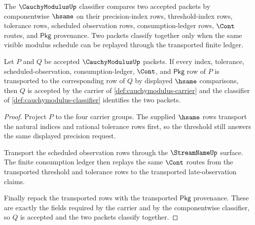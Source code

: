 \begin{definition}
\label{def:cauchymodulus-classifier}
The $\CauchyModulusUp$ classifier compares two accepted packets by componentwise
$\hsame$ on their precision-index rows, threshold-index rows, tolerance rows,
scheduled observation rows, consumption-ledger rows, $\Cont$ routes, and
$\mathsf{Pkg}$ provenance. Two packets classify together only when the same
visible modulus schedule can be replayed through the transported finite ledger.
\end{definition}

\begin{theorem}
\label{thm:cauchymodulus-hsame-stability}
Let $P$ and $Q$ be accepted $\CauchyModulusUp$ packets. If every index,
tolerance, scheduled-observation, consumption-ledger, $\Cont$, and
$\mathsf{Pkg}$ row of $P$ is transported to the corresponding row of $Q$ by
displayed $\hsame$ comparisons, then $Q$ is accepted by the carrier of
\autoref{def:cauchymodulus-carrier} and the classifier of
\autoref{def:cauchymodulus-classifier} identifies the two packets.
\end{theorem}
\begin{proof}
Project $P$ to the four carrier groups. The supplied $\hsame$ rows transport
the natural indices and rational tolerance rows first, so the threshold still
answers the same displayed precision request.

Transport the scheduled observation rows through the $\StreamNameUp$ surface.
The finite consumption ledger then replays the same $\Cont$ routes from the
transported threshold and tolerance rows to the transported late-observation
claims.

Finally repack the transported rows with the transported $\mathsf{Pkg}$
provenance. These are exactly the fields required by the carrier and by the
componentwise classifier, so $Q$ is accepted and the two packets classify
together.
\end{proof}

